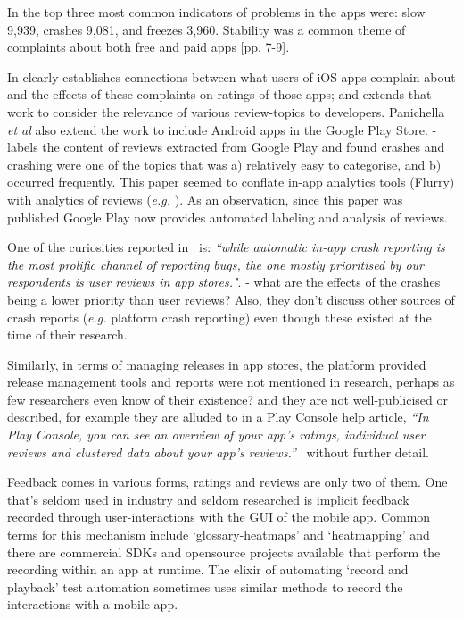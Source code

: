 In \textcite[p. 5][]{fu2013_why_people_hate_your_app_making_sense_of_user_feedback_in_a_mobile_app_store} the top three most common indicators of problems in the apps were: slow 9,939, crashes 9,081, and freezes 3,960. Stability was a common theme of complaints about both free and paid apps [pp. 7-9]. 

In  clearly establishes connections between what users of iOS apps complain about and the effects of these complaints on ratings of those apps; and  extends that work to consider the relevance of various review-topics to developers. Panichella \emph{et al} also extend the work to include Android apps in the Google Play Store.  - labels the content of reviews extracted from Google Play and found crashes and crashing were one of the topics that was a) relatively easy to categorise, and b) occurred frequently. This paper seemed to conflate in-app analytics tools (Flurry) with analytics of reviews (\emph{e.g.} ). As an observation, since this paper was published Google Play now provides automated labeling and analysis of reviews.

One of the curiosities reported in~ is: \emph{``while automatic in-app crash reporting is the most prolific channel of reporting bugs, the one mostly prioritised by our respondents is user reviews in app stores."}. - what are the effects of the crashes being a lower priority than user reviews? Also, they don't discuss other sources of crash reports (\emph{e.g.} platform crash reporting) even though these existed at the time of their research.

Similarly, in terms of managing releases in app stores, the platform provided release management tools and reports were not mentioned in research, perhaps as few researchers even know of their existence? and they are not well-publicised or described, for example they are alluded to in a Play Console help article, \emph{``In Play Console, you can see an overview of your app's ratings, individual user reviews and clustered data about your app's reviews.''}~ without further detail.

Feedback comes in various forms, ratings and reviews are only two of them.  One that's seldom used in industry and seldom researched is implicit feedback recorded through user-interactions with the GUI of the mobile app. Common terms for this mechanism include `\glspl{glossary-heatmap}' and `heatmapping' and there are commercial SDKs and opensource projects available that perform the recording within an app at runtime. The elixir of automating `record and playback' test automation sometimes uses similar methods to record the interactions with a mobile app. 




